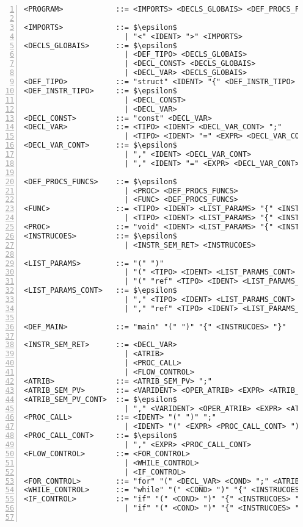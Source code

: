 
\begin{lstlisting}[frame=single,numbers=left,breaklines=true,mathescape=true>]
<PROGRAM>            ::= <IMPORTS> <DECLS_GLOBAIS> <DEF_PROCS_FUNCS> <DEF_MAIN>

<IMPORTS>            ::= $\epsilon$
                       | "<" <IDENT> ">" <IMPORTS>
<DECLS_GLOBAIS>      ::= $\epsilon$
                       | <DEF_TIPO> <DECLS_GLOBAIS>
                       | <DECL_CONST> <DECLS_GLOBAIS>
                       | <DECL_VAR> <DECLS_GLOBAIS>  
<DEF_TIPO>           ::= "struct" <IDENT> "{" <DEF_INSTR_TIPO> "}"
<DEF_INSTR_TIPO>     ::= $\epsilon$
                       | <DECL_CONST>
					   | <DECL_VAR>
<DECL_CONST>         ::= "const" <DECL_VAR>
<DECL_VAR>           ::= <TIPO> <IDENT> <DECL_VAR_CONT> ";"
                       | <TIPO> <IDENT> "=" <EXPR> <DECL_VAR_CONT> ";"
<DECL_VAR_CONT>      ::= $\epsilon$
                       | "," <IDENT> <DECL_VAR_CONT>
					   | "," <IDENT> "=" <EXPR> <DECL_VAR_CONT>

<DEF_PROCS_FUNCS>    ::= $\epsilon$
                       | <PROC> <DEF_PROCS_FUNCS>
					   | <FUNC> <DEF_PROCS_FUNCS>
<FUNC>               ::= <TIPO> <IDENT> <LIST_PARAMS> "{" <INSTRUCOES> "return" <EXPR> "}"
                       | <TIPO> <IDENT> <LIST_PARAMS> "{" <INSTRUCOES> "return" <EXPR> ";" "}"
<PROC>               ::= "void" <IDENT> <LIST_PARAMS> "{" <INSTRUCOES> "}"
<INSTRUCOES>         ::= $\epsilon$
                       | <INSTR_SEM_RET> <INSTRUCOES>

<LIST_PARAMS>        ::= "(" ")"
                       | "(" <TIPO> <IDENT> <LIST_PARAMS_CONT> ")"
					   | "(" "ref" <TIPO> <IDENT> <LIST_PARAMS_CONT> ")"
<LIST_PARAMS_CONT>   ::= $\epsilon$
                       | "," <TIPO> <IDENT> <LIST_PARAMS_CONT>
					   | "," "ref" <TIPO> <IDENT> <LIST_PARAMS_CONT>

<DEF_MAIN>           ::= "main" "(" ")" "{" <INSTRUCOES> "}"

<INSTR_SEM_RET>      ::= <DECL_VAR>
                       | <ATRIB>
					   | <PROC_CALL>
					   | <FLOW_CONTROL>
<ATRIB>              ::= <ATRIB_SEM_PV> ";"
<ATRIB_SEM_PV>       ::= <VARIDENT> <OPER_ATRIB> <EXPR> <ATRIB_SEM_PV_CONT>
<ATRIB_SEM_PV_CONT>  ::= $\epsilon$
                       | "," <VARIDENT> <OPER_ATRIB> <EXPR> <ATRIB_SEM_PV_CONT>
<PROC_CALL>          ::= <IDENT> "(" ")" ";"
                       | <IDENT> "(" <EXPR> <PROC_CALL_CONT> ")" ";"
<PROC_CALL_CONT>     ::= $\epsilon$
                       | "," <EXPR> <PROC_CALL_CONT>
<FLOW_CONTROL>       ::= <FOR_CONTROL>
                       | <WHILE_CONTROL>
					   | <IF_CONTROL>
<FOR_CONTROL>        ::= "for" "(" <DECL_VAR> <COND> ";" <ATRIB_SEM_PV> ")" "{" <INSTRUCOES> "}"
<WHILE_CONTROL>      ::= "while" "(" <COND> ")" "{" <INSTRUCOES> "}"
<IF_CONTROL>         ::= "if" "(" <COND> ")" "{" <INSTRUCOES> "}"
                       | "if" "(" <COND> ")" "{" <INSTRUCOES> "}" "else" "{" <INSTRUCOES> "}"


\end{lstlisting}
